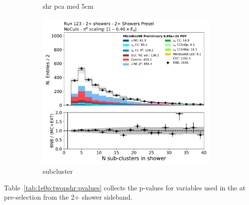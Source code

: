 \begin{figure}[H]
\begin{subfigure}{0.3\textwidth}
    \caption{shr pca med 5cm}
    \end{subfigure}
    \begin{subfigure}{0.3\textwidth}
    \includegraphics[width=1.0\textwidth]{Sidebands/Figures/TwoShr_1e0pSel/Presel/subcluster.pdf}
    \caption{subcluster}
    \end{subfigure}
    \caption{} 
    \label{fig:HE_1eNp_1}
\end{figure}

Table~\ref{tab:1e0p:twopshr:pvalues} collects the p-values for variables used in the \zpsel at pre-selection from the 2+ shower sideband.

